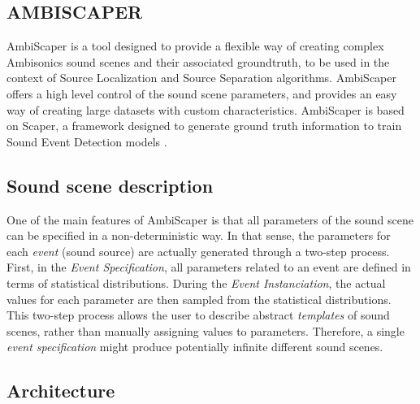 \subsection{AMBISCAPER}
\label{sec:ambiscaper}


AmbiScaper \cite{ambiscaper} is a tool designed to provide a flexible way of creating complex Ambisonics sound scenes and their associated groundtruth, to be used in the context of Source Localization and Source Separation algorithms.
AmbiScaper offers a high level control of the sound scene parameters, and provides an easy way of creating large datasets with custom characteristics.
AmbiScaper is based on Scaper, a framework designed to generate ground truth information to train Sound Event Detection models \cite{Salamon2017}.

\subsection{Sound scene description}
\label{subsec:description}

One of the main features of AmbiScaper is that all parameters of the sound scene can be specified in a non-deterministic way. In that sense, the parameters for each \textit{event} (sound source) are actually generated through a two-step process. First, in the \textit{Event Specification}, all parameters related to an event are defined in terms of statistical distributions. During the \textit{Event Instanciation}, the actual values for each parameter are then sampled from the statistical distributions.
This two-step process allows the user to describe abstract \textit{templates} of sound scenes, rather than manually assigning values to parameters. Therefore, a single \textit{event specification} might produce potentially infinite different sound scenes. 



\subsection{Architecture}
\label{subsec:architecture}

